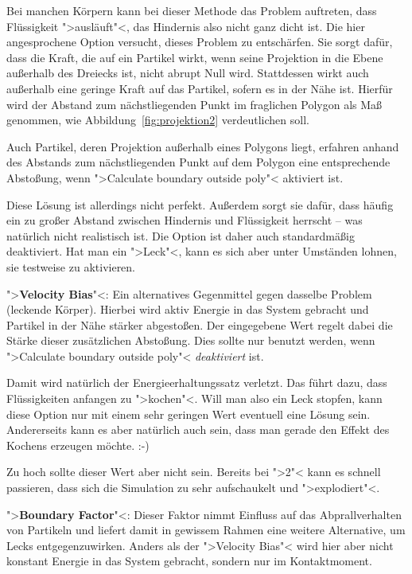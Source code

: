 \documentclass[10pt,DIV=14,a4paper]{scrartcl}
\begin{document}
	Bei manchen Körpern kann bei dieser Methode das Problem auftreten,
	dass Flüssigkeit ">ausläuft"<, das Hindernis also nicht ganz dicht
	ist. Die hier angesprochene Option versucht, dieses Problem zu
	entschärfen. Sie sorgt dafür, dass die Kraft, die auf ein Partikel
	wirkt, wenn seine Projektion in die Ebene außerhalb des Dreiecks
	ist, nicht abrupt Null wird. Stattdessen wirkt auch außerhalb eine
	geringe Kraft auf das Partikel, sofern es in der Nähe ist. Hierfür
	wird der Abstand zum nächstliegenden Punkt im fraglichen Polygon als
	Maß genommen, wie Abbildung~\ref{fig:projektion2} verdeutlichen
	soll.

	{Auch Partikel, deren Projektion außerhalb eines Polygons liegt,
	erfahren anhand des Abstands zum nächstliegenden Punkt auf dem
	Polygon eine entsprechende Abstoßung, wenn ">Calculate boundary
	outside poly"< aktiviert ist.}

	Diese Lösung ist allerdings nicht perfekt. Außerdem sorgt sie dafür,
	dass häufig ein zu großer Abstand zwischen Hindernis und Flüssigkeit
	herrscht -- was natürlich nicht realistisch ist. Die Option ist
	daher auch standardmäßig deaktiviert. Hat man ein ">Leck"<, kann es
	sich aber unter Umständen lohnen, sie testweise zu aktivieren.

	\item ">\textbf{Velocity Bias}"<: Ein alternatives Gegenmittel gegen
	dasselbe Problem (leckende Körper). Hierbei wird aktiv Energie in
	das System gebracht und Partikel in der Nähe stärker abgestoßen. Der
	eingegebene Wert regelt dabei die Stärke dieser zusätzlichen
	Abstoßung. Dies sollte nur benutzt werden, wenn ">Calculate boundary
	outside poly"< \emph{deaktiviert} ist.

	Damit wird natürlich der Energieerhaltungssatz verletzt. Das führt
	dazu, dass Flüssigkeiten anfangen zu ">kochen"<. Will man also ein
	Leck stopfen, kann diese Option nur mit einem sehr geringen Wert
	eventuell eine Lösung sein. Andererseits kann es aber natürlich auch
	sein, dass man gerade den Effekt des Kochens erzeugen möchte. :-)

	Zu hoch sollte dieser Wert aber nicht sein. Bereits bei ">2"< kann
	es schnell passieren, dass sich die Simulation zu sehr aufschaukelt
	und ">explodiert"<.

	\item ">\textbf{Boundary Factor}"<: Dieser Faktor nimmt Einfluss auf
	das Abprallverhalten von Partikeln und liefert damit in gewissem
	Rahmen eine weitere Alternative, um Lecks entgegenzuwirken. Anders
	als der ">Velocity Bias"< wird hier aber nicht konstant Energie in
	das System gebracht, sondern nur im Kontaktmoment.
\end{document}
